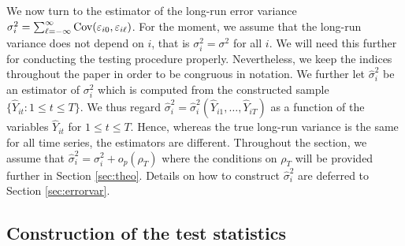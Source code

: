 \documentclass[a4paper,12pt]{article}
\newcommand{\doublehattwo}[1]{\widehat{\widehat{#1}}}
\begin{document}
We now turn to the estimator of the long-run error variance $\sigma_i^2 = \sum\nolimits_{\ell=-\infty}^{\infty} \textnormal{Cov}(\varepsilon_{i0}, \varepsilon_{i\ell})$. For the moment, we assume that the long-run variance does not depend on $i$, that is $\sigma_i^2 = \sigma^2$ for all $i$. We will need this further for conducting the testing procedure properly. Nevertheless, we keep the indices throughout the paper in order to be congruous in notation. We further let $\widehat{\sigma}_i^2$ be an estimator of $\sigma_i^2$ which is computed from the constructed sample $\{ \widehat{Y}_{it}: 1 \le t \le T \}$. We thus regard $\widehat{\sigma}_i^2 = \widehat{\sigma}_i^2(\widehat{Y}_{i1},\ldots,\widehat{Y}_{iT})$ as a function of the variables $\widehat{Y}_{it}$ for $1 \le t \le T$. Hence, whereas the true long-run variance is the same for all time series, the estimators are different. Throughout the section, we assume that $\widehat{\sigma}_i^2 = \sigma_i^2 + o_p(\rho_T)$ where the conditions on $\rho_T$ will be provided further in Section \ref{sec:theo}. Details on how to construct $\widehat{\sigma}_i^2$ are deferred to Section \ref{sec:errorvar}. 


\subsection{Construction of the test statistics}\label{subsec:test:stat}
\end{document}
